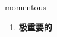 
\begin{frame}
{\huge momentous}
\begin{center}
\begin{enumerate}\Large
  \item \textbf{极重要的}
\end{enumerate}
\end{center}
\end{frame}
